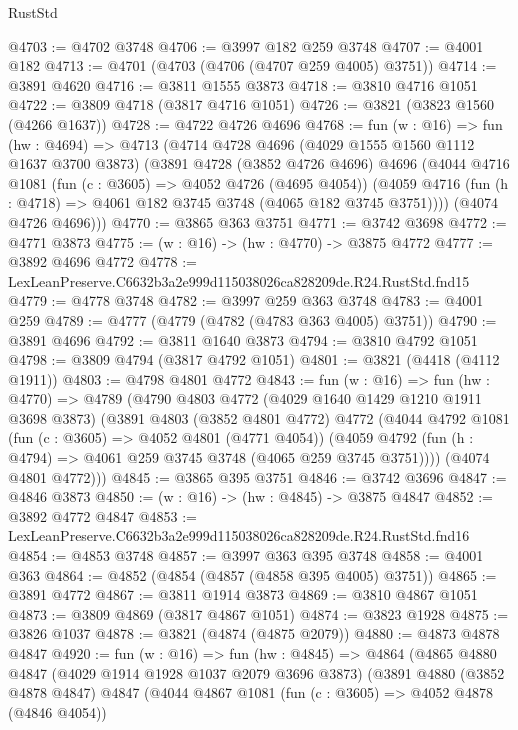 \begin{lexlean}{RustStd}
\begin{coremodule}
@4703 := @4702 @3748
@4706 := @3997 @182 @259 @3748
@4707 := @4001 @182
@4713 := @4701 (@4703 (@4706 (@4707 @259 @4005) @3751))
@4714 := @3891 @4620
@4716 := @3811 @1555 @3873
@4718 := @3810 @4716 @1051
@4722 := @3809 @4718 (@3817 @4716 @1051)
@4726 := @3821 (@3823 @1560 (@4266 @1637))
@4728 := @4722 @4726 @4696
@4768 := fun (w : @16) =>
  fun (hw : @4694) =>
  @4713
    (@4714
      @4728
      @4696
      (@4029 @1555 @1560 @1112 @1637 @3700 @3873)
      (@3891
        @4728
        (@3852 @4726 @4696)
        @4696
        (@4044
          @4716
          @1081
          (fun (c : @3605) => @4052 @4726 (@4695 @4054))
          (@4059 @4716 (fun (h : @4718) => @4061 @182 @3745 @3748 (@4065 @182 @3745 @3751))))
        (@4074 @4726 @4696)))
@4770 := @3865 @363 @3751
@4771 := @3742 @3698
@4772 := @4771 @3873
@4775 := (w : @16) -> (hw : @4770) -> @3875 @4772
@4777 := @3892 @4696 @4772
@4778 := LexLeanPreserve.C6632b3a2e999d115038026ca828209de.R24.RustStd.fnd15
@4779 := @4778 @3748
@4782 := @3997 @259 @363 @3748
@4783 := @4001 @259
@4789 := @4777 (@4779 (@4782 (@4783 @363 @4005) @3751))
@4790 := @3891 @4696
@4792 := @3811 @1640 @3873
@4794 := @3810 @4792 @1051
@4798 := @3809 @4794 (@3817 @4792 @1051)
@4801 := @3821 (@4418 (@4112 @1911))
@4803 := @4798 @4801 @4772
@4843 := fun (w : @16) =>
  fun (hw : @4770) =>
  @4789
    (@4790
      @4803
      @4772
      (@4029 @1640 @1429 @1210 @1911 @3698 @3873)
      (@3891
        @4803
        (@3852 @4801 @4772)
        @4772
        (@4044
          @4792
          @1081
          (fun (c : @3605) => @4052 @4801 (@4771 @4054))
          (@4059 @4792 (fun (h : @4794) => @4061 @259 @3745 @3748 (@4065 @259 @3745 @3751))))
        (@4074 @4801 @4772)))
@4845 := @3865 @395 @3751
@4846 := @3742 @3696
@4847 := @4846 @3873
@4850 := (w : @16) -> (hw : @4845) -> @3875 @4847
@4852 := @3892 @4772 @4847
@4853 := LexLeanPreserve.C6632b3a2e999d115038026ca828209de.R24.RustStd.fnd16
@4854 := @4853 @3748
@4857 := @3997 @363 @395 @3748
@4858 := @4001 @363
@4864 := @4852 (@4854 (@4857 (@4858 @395 @4005) @3751))
@4865 := @3891 @4772
@4867 := @3811 @1914 @3873
@4869 := @3810 @4867 @1051
@4873 := @3809 @4869 (@3817 @4867 @1051)
@4874 := @3823 @1928
@4875 := @3826 @1037
@4878 := @3821 (@4874 (@4875 @2079))
@4880 := @4873 @4878 @4847
@4920 := fun (w : @16) =>
  fun (hw : @4845) =>
  @4864
    (@4865
      @4880
      @4847
      (@4029 @1914 @1928 @1037 @2079 @3696 @3873)
      (@3891
        @4880
        (@3852 @4878 @4847)
        @4847
        (@4044
          @4867
          @1081
          (fun (c : @3605) => @4052 @4878 (@4846 @4054))

\end{coremodule}
\end{lexlean}
